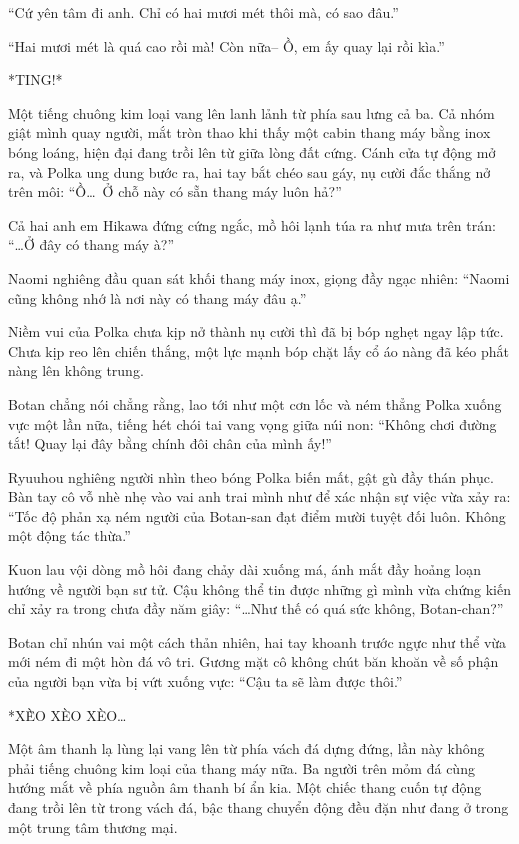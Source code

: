 \documentclass[../main.tex]{subfiles}
\begin{document}
``Cứ yên tâm đi anh. Chỉ có hai mươi mét thôi mà, có sao đâu.''

``Hai mươi mét là quá cao rồi mà! Còn nữa-- Ồ, em ấy quay lại rồi kìa.''

*TING!*

Một tiếng chuông kim loại vang lên lanh lảnh từ phía sau lưng cả ba. Cả nhóm giật mình quay người, mắt tròn thao khi thấy một cabin thang máy bằng inox bóng loáng, hiện đại đang trồi lên từ giữa lòng đất cứng. Cánh cửa tự động mở ra, và Polka ung dung bước ra, hai tay bắt chéo sau gáy, nụ cười đắc thắng nở trên môi: ``Ồ\dots\ Ở chỗ này có sẵn thang máy luôn hả?''


Cả hai anh em Hikawa đứng cứng ngắc, mồ hôi lạnh túa ra như mưa trên trán: ``\dots Ở đây có thang máy à?''

Naomi nghiêng đầu quan sát khối thang máy inox, giọng đầy ngạc nhiên: ``Naomi cũng không nhớ là nơi này có thang máy đâu ạ.''

Niềm vui của Polka chưa kịp nở thành nụ cười thì đã bị bóp nghẹt ngay lập tức. Chưa kịp reo lên chiến thắng, một lực mạnh bóp chặt lấy cổ áo nàng đã kéo phắt nàng lên không trung.

Botan chẳng nói chẳng rằng, lao tới như một cơn lốc và ném thẳng Polka xuống vực một lần nữa, tiếng hét chói tai vang vọng giữa núi non: ``Không chơi đường tắt! Quay lại đây bằng chính đôi chân của mình ấy!''

Ryuuhou nghiêng người nhìn theo bóng Polka biến mất, gật gù đầy thán phục. Bàn tay cô vỗ nhè nhẹ vào vai anh trai mình như để xác nhận sự việc vừa xảy ra: ``Tốc độ phản xạ ném người của Botan-san đạt điểm mười tuyệt đối luôn. Không một động tác thừa.''

Kuon lau vội dòng mồ hôi đang chảy dài xuống má, ánh mắt đầy hoảng loạn hướng về người bạn sư tử. Cậu không thể tin được những gì mình vừa chứng kiến chỉ xảy ra trong chưa đầy năm giây: ``\dots Như thế có quá sức không, Botan-chan?''

Botan chỉ nhún vai một cách thản nhiên, hai tay khoanh trước ngực như thể vừa mới ném đi một hòn đá vô tri. Gương mặt cô không chút băn khoăn về số phận của người bạn vừa bị vứt xuống vực: ``Cậu ta sẽ làm được thôi.''

*XÈ̀O XÈO XÈO\dots*

Một âm thanh lạ lùng lại vang lên từ phía vách đá dựng đứng, lần này không phải tiếng chuông kim loại của thang máy nữa. Ba người trên mỏm đá cùng hướng mắt về phía nguồn âm thanh bí ẩn kia. Một chiếc thang cuốn tự động đang trồi lên từ trong vách đá, bậc thang chuyển động đều đặn như đang ở trong một trung tâm thương mại.
\end{document}
